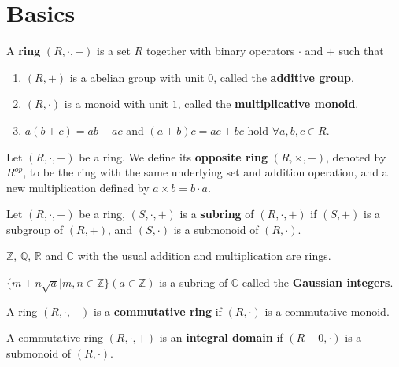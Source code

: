 \documentclass[12pt]{book}
\begin{document}
\section{Basics}

\begin{definition}
	A {\bf ring} $(R,\cdot,+)$ is a set $R$ together with binary operators $\cdot$ and $+$ such that
	\begin{enumerate}
		\item $(R,+)$ is a abelian group with unit $0$, called the {\bf additive group}.
		\item $(R,\cdot)$ is a monoid with unit $1$, called the {\bf multiplicative monoid}.
		\item $a(b+c)=ab+ac$ and $(a+b)c=ac+bc$ hold $\forall a,b,c\in R$.
	\end{enumerate}
\end{definition}

\begin{definition}
	Let $(R,\cdot,+)$ be a ring. We define its {\bf opposite ring} $(R,\times,+)$, denoted by $R^{op}$, to be the ring with the same underlying set and addition operation, and a new multiplication defined by $a\times b=b\cdot a$.
\end{definition}
	
\begin{definition}
	Let $(R,\cdot,+)$ be a ring, $(S,\cdot,+)$ is a {\bf subring} of $(R,\cdot,+)$ if $(S,+)$ is a subgroup of $(R,+)$, and $(S,\cdot)$ is a submonoid of $(R,\cdot)$.
\end{definition}

\begin{example}
	$\mathbb Z$, $\mathbb Q$, $\mathbb R$ and $\mathbb C$ with the usual addition and multiplication are rings.
\end{example}

\begin{example}
	$\{m+n\sqrt a|m,n\in\mathbb Z\}(a\in\mathbb Z)$ is a subring of $\mathbb C$ called the {\bf Gaussian integers}.
\end{example}

\begin{definition}
	A ring $(R,\cdot,+)$ is a {\bf commutative ring} if $(R,\cdot)$ is a commutative monoid.
\end{definition}

\begin{definition}
	A commutative ring $(R,\cdot,+)$ is an {\bf integral domain} if $(R-0,\cdot)$ is a submonoid of $(R,\cdot)$.
\end{definition}
\end{document}
